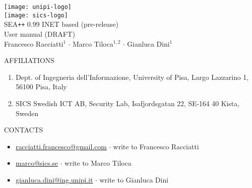 \begin{minipage}[c]{0.9\textwidth}
\footnotesize
\vspace{.05\textheight}
\begin{center}
\texttt{[image: unipi-logo]}\\[2\baselineskip]
\texttt{[image: sics-logo]}\\[6\baselineskip]

SEA\texttt{++} 0.99 INET based (pre-release)\\[0.2\baselineskip]
User manual (DRAFT)\\[1\baselineskip]
{
Francesco Racciatti$^1$ $\cdot$ Marco Tiloca$^{1,2}$ $\cdot$ Gianluca Dini$^1$\\[2\baselineskip]
}
\end{center}

\vspace{.2\textheight}
AFFILIATIONS
%
\begin{enumerate}
\item Dept. of Ingegneria dell'Informazione, University of Pisa, Largo Lazzarino 1, 56100 Pisa, Italy
\item SICS Swedish ICT AB, Security Lab, Isafjordsgatan 22, SE-164 40 Kista, Sweden
\end{enumerate}


\vspace{.05\textheight}
CONTACTS
%
\begin{itemize}
\item \href{mailto:racciatti.francesco@gmail.com}{racciatti.francesco@gmail.com} $\cdot$ write to Francesco Racciatti
\item \href{mailto:marco@sics.se}{marco@sics.se} $\cdot$ write to Marco Tiloca
\item \href{mailto:gianluca.dini@ing.unipi.it}{gianluca.dini@ing.unipi.it} $\cdot$ write to Gianluca Dini
\end{itemize}
%
\end{minipage}
\cleardoublepage
